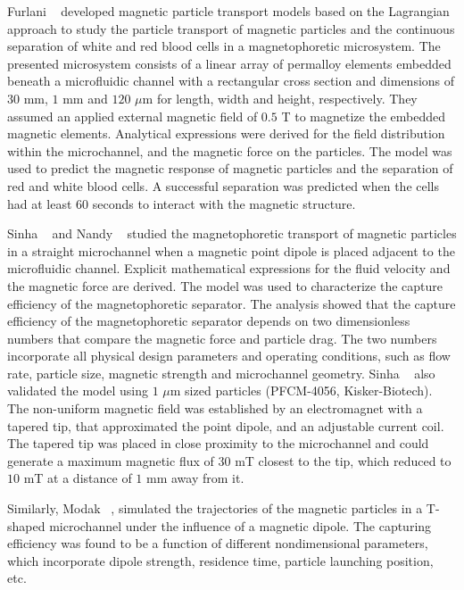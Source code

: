 Furlani \etal{}~\cite{Furlani2006,Furlani2007,Furlani2010} developed magnetic particle transport models based on the Lagrangian approach to study the particle transport of magnetic particles and the continuous separation of white and red blood cells in a magnetophoretic microsystem. The presented microsystem consists of a linear array of permalloy elements embedded beneath a microfluidic channel with a rectangular cross section and dimensions of $30$ mm, $1$ mm and $120$ $\mu$m for length, width and height, respectively. They assumed an applied external magnetic field of $0.5$ T to magnetize the embedded magnetic elements. Analytical expressions were derived for the field distribution within the microchannel, and the magnetic force on the particles. The model was used to predict the magnetic response of magnetic particles and the separation of red and white blood cells. A successful separation was predicted when the cells had at least $60$ seconds to interact with the magnetic structure.  

Sinha \etal{}~\cite{Sinha2007,Sinha2009} and Nandy \etal{}~\cite{Nandy2008} studied the magnetophoretic transport of magnetic particles in a straight microchannel when a magnetic point dipole is placed adjacent to the microfluidic channel. Explicit mathematical expressions for the fluid velocity and the magnetic force are derived. The model was used to characterize the capture efficiency of the magnetophoretic separator. The analysis showed that the capture efficiency of the magnetophoretic separator depends on two dimensionless numbers that compare the magnetic force and particle drag. The two numbers incorporate all physical design parameters and operating conditions, such as flow rate, particle size, magnetic strength and microchannel geometry. Sinha \etal{}~\cite{Sinha2009} also validated the model using $1$ $\mu$m sized particles (PFCM-4056, Kisker-Biotech). The non-uniform magnetic field was established by an electromagnet with a tapered tip, that approximated the point dipole, and an adjustable current coil. The tapered tip was placed in close proximity to the microchannel and could generate a maximum magnetic flux of $30$ mT closest to the tip, which reduced to $10$ mT at a distance of $1$ mm away from it. 

Similarly, Modak \etal{}~\cite{Modak2009}, simulated the trajectories of the magnetic particles in a T-shaped microchannel under the influence of a magnetic dipole. The capturing efficiency was found to be a function of different nondimensional parameters, which incorporate dipole strength, residence time, particle launching position, etc. 

